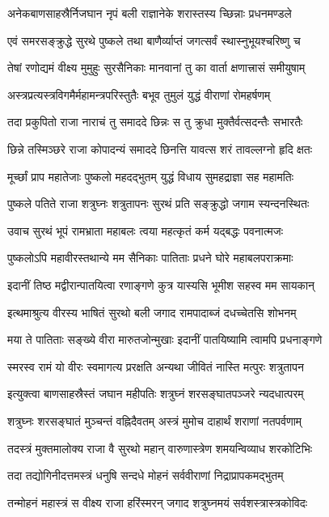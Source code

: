 \twolineshloka
{अनेकबाणसाहस्रैर्निजघान नृपं बली}
{राज्ञानेके शरास्तस्य च्छिन्नाः प्रधनमण्डले}%

\twolineshloka
{एवं समरसङ्क्रुद्धे सुरथे पुष्कले तथा}
{बाणैर्व्याप्तं जगत्सर्वं स्थास्नुभूयश्चरिष्णु च}%

\twolineshloka
{तेषां रणोद्यमं वीक्ष्य मुमुहुः सुरसैनिकाः}
{मानवानां तु का वार्ता क्षणात्त्रासं समीयुषाम्}%

\twolineshloka
{अस्त्रप्रत्यस्त्रविगमैर्महामन्त्रपरिस्तुतैः}
{बभूव तुमुलं युद्धं वीराणां रोमहर्षणम्}%

\twolineshloka
{तदा प्रकुपितो राजा नाराचं तु समाददे}
{छिन्नः स तु क्रुधा मुक्तैर्वत्सदन्तैः सभारतैः}%

\twolineshloka
{छिन्ने तस्मिञ्छरे राजा कोपादन्यं समाददे}
{छिनत्ति यावत्स शरं तावल्लग्नो हृदि क्षतः}%

\twolineshloka
{मूर्च्छां प्राप महातेजाः पुष्कलो महदद्भुतम्}
{युद्धं विधाय सुमहद्राज्ञा सह महामतिः}%

\twolineshloka
{पुष्कले पतिते राजा शत्रुघ्नः शत्रुतापनः}
{सुरथं प्रति सङ्क्रुद्धो जगाम स्यन्दनस्थितः}%

\twolineshloka
{उवाच सुरथं भूपं रामभ्राता महाबलः}
{त्वया महत्कृतं कर्म यद्बद्धः पवनात्मजः}%

\twolineshloka
{पुष्कलोऽपि महावीरस्तथान्ये मम सैनिकाः}
{पातिताः प्रधने घोरे महाबलपराक्रमाः}%

\twolineshloka
{इदानीं तिष्ठ मद्वीरान्पातयित्वा रणाङ्गणे}
{कुत्र यास्यसि भूमीश सहस्व मम सायकान्}%

\twolineshloka
{इत्थमाश्रुत्य वीरस्य भाषितं सुरथो बली}
{जगाद रामपादाब्जं दधच्चेतसि शोभनम्}%

\twolineshloka
{मया ते पातिताः सङ्ख्ये वीरा मारुतजोन्मुखाः}
{इदानीं पातयिष्यामि त्वामपि प्रधनाङ्गणे}%

\twolineshloka
{स्मरस्व रामं यो वीरः स्वमागत्य प्ररक्षति}
{अन्यथा जीवितं नास्ति मत्पुरः शत्रुतापन}%

\twolineshloka
{इत्युक्त्वा बाणसाहस्रैस्तं जघान महीपतिः}
{शत्रुघ्नं शरसङ्घातपञ्जरे न्यदधात्परम्}%

\twolineshloka
{शत्रुघ्नः शरसङ्घातं मुञ्चन्तं वह्निदैवतम्}
{अस्त्रं मुमोच दाहार्थं शराणां नतपर्वणाम्}%

\twolineshloka
{तदस्त्रं मुक्तमालोक्य राजा वै सुरथो महान्}
{वारुणास्त्रेण शमयन्विव्याध शरकोटिभिः}%

\twolineshloka
{तदा तद्योगिनीदत्तमस्त्रं धनुषि सन्दधे}
{मोहनं सर्ववीराणां निद्राप्रापकमद्भुतम्}%

\twolineshloka
{तन्मोहनं महास्त्रं स वीक्ष्य राजा हरिंस्मरन्}
{जगाद शत्रुघ्नमयं सर्वशस्त्रास्त्रकोविदः}%

